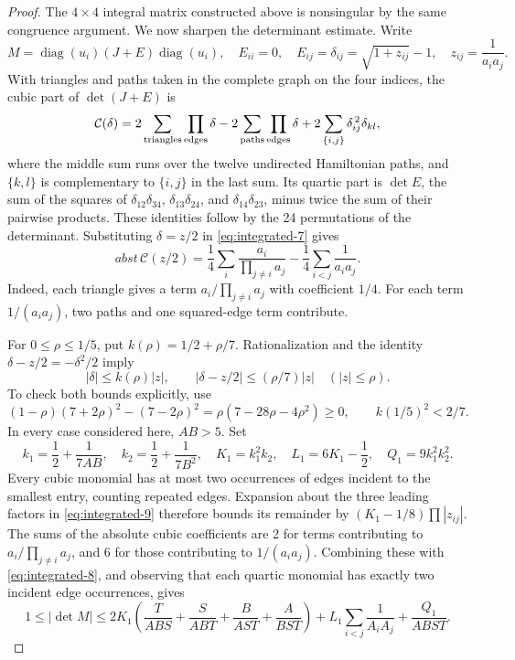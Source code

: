 \documentclass[12pt]{article}
\numberwithin{equation}{section}
\begin{document}
\begin{proof}
The $4\times4$ integral matrix constructed above is nonsingular by
the same congruence argument. We now sharpen the determinant estimate. Write
\[
 M=\operatorname{diag}(u_i)(J+E)\operatorname{diag}(u_i),\quad
 E_{ii}=0,\quad E_{ij}=\delta_{ij}
 =\sqrt{1+z_{ij}}-1,\quad z_{ij}=\frac1{a_i a_j}.
\]
With triangles and paths taken in the complete graph on the four indices,
the cubic part of \(\det(J+E)\) is
\begin{equation}\label{eq:integrated-7}
\mathcal C(\delta)=
 2\sum_{\rm triangles}\prod_{\rm edges}\delta
 -2\sum_{\rm paths}\prod_{\rm edges}\delta
 +2\sum_{\{i,j\}}\delta_{ij}^{\,2}\delta_{kl},
\end{equation}
where the middle sum runs over the twelve undirected Hamiltonian paths,
and \(\{k,l\}\) is complementary to \(\{i,j\}\) in the last sum.
Its quartic part is \(\det E\), the sum of the squares of
\(\delta_{12}\delta_{34}\), \(\delta_{13}\delta_{24}\), and
\(\delta_{14}\delta_{23}\), minus twice the sum of their pairwise products. These identities follow by the 24 permutations of the determinant.
Substituting \(\delta=z/2\) in \eqref{eq:integrated-7} gives
\begin{equation}\label{eq:integrated-8}
abst\,\mathcal C(z/2)
 =\frac14\sum_i\frac{a_i}{\prod_{j\ne i}a_j}
                  -\frac14\sum_{i<j}\frac1{a_i a_j}.
\end{equation}
Indeed, each triangle gives a term \(a_i/\prod_{j\ne i}a_j\)
with coefficient \(1/4\). For each term \(1/(a_i a_j)\), two paths
and one squared-edge term contribute.

For \(0\le\rho\le1/5\), put \(k(\rho)=1/2+\rho/7\).
Rationalization and the identity
\(\delta-z/2=-\delta^2/2\) imply
\begin{equation}\label{eq:integrated-9}
|\delta|\le k(\rho)|z|,\qquad
 |\delta-z/2|\le(\rho/7)|z| \quad (|z|\le\rho).
\end{equation}
To check both bounds explicitly, use
\[
 (1-\rho)(7+2\rho)^2-(7-2\rho)^2
   =\rho(7-28\rho-4\rho^2)\ge0,\qquad
 k(1/5)^2<2/7.
\]
In every case considered here, \(AB>5\). Set
\[
 k_1=\frac12+\frac1{7AB},\quad k_2=\frac12+\frac1{7B^2},
 \quad K_1=k_1^2k_2,\quad L_1=6K_1-\frac12,\quad
 Q_1=9k_1^2k_2^2.
\]
Every cubic monomial has at most two occurrences of edges incident to
the smallest entry, counting repeated edges. Expansion about the three
leading factors in \eqref{eq:integrated-9} therefore bounds its remainder by
\((K_1-1/8)\prod|z_{ij}|\).
The sums of the absolute cubic coefficients are 2 for terms contributing
to \(a_i/\prod_{j\ne i}a_j\), and 6 for those contributing to
\(1/(a_i a_j)\). Combining these with \eqref{eq:integrated-8}, and observing
that each quartic monomial has exactly two incident edge occurrences,
gives
\begin{equation}\label{eq:integrated-10}
1\le|\det M|\le
 2K_1\left(\frac{T}{ABS}+\frac{S}{ABT}
                    +\frac{B}{AST}+\frac{A}{BST}\right)
 +L_1\sum_{i<j}\frac1{A_iA_j}+\frac{Q_1}{ABST}.
\end{equation}


\end{proof}
\end{document}
